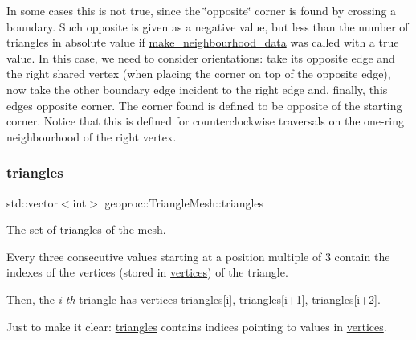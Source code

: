 In some cases this is not true, since the \char`\"{}opposite\char`\"{} corner is found by crossing a boundary. Such opposite is given as a negative value, but less than the number of triangles in absolute value if \hyperlink{classgeoproc_1_1TriangleMesh_a84003dfdfd5e591c00f01a797578ff1f}{make\+\_\+neighbourhood\+\_\+data} was called with a \textquotesingle{}true\textquotesingle{} value. In this case, we need to consider orientations\+: take its opposite edge and the \textquotesingle{}right\textquotesingle{} shared vertex (when placing the corner \textquotesingle{}on top of\textquotesingle{} the opposite edge), now take the other boundary edge incident to the \textquotesingle{}right\textquotesingle{} edge and, finally, this edge\textquotesingle{}s opposite corner. The corner found is defined to be opposite of the starting corner. Notice that this is defined for counterclockwise traversals on the one-\/ring neighbourhood of the \textquotesingle{}right\textquotesingle{} vertex. \mbox{\label{classgeoproc_1_1TriangleMesh_ad1cf20622f2bb080100862f413bd89c2}} 
\subsubsection{\texorpdfstring{triangles}{triangles}}
{\footnotesize\ttfamily std\+::vector$<$int$>$ geoproc\+::\+Triangle\+Mesh\+::triangles\hspace{0.3cm}{\ttfamily [protected]}}



The set of triangles of the mesh. 

Every three consecutive values starting at a position multiple of 3 contain the indexes of the vertices (stored in \hyperlink{classgeoproc_1_1TriangleMesh_a72052fc497d349c48966b937e5e3e834}{vertices}) of the triangle.

Then, the {\itshape i-\/th} triangle has vertices \hyperlink{classgeoproc_1_1TriangleMesh_ad1cf20622f2bb080100862f413bd89c2}{triangles}\mbox{[}i\mbox{]}, \hyperlink{classgeoproc_1_1TriangleMesh_ad1cf20622f2bb080100862f413bd89c2}{triangles}\mbox{[}i+1\mbox{]}, \hyperlink{classgeoproc_1_1TriangleMesh_ad1cf20622f2bb080100862f413bd89c2}{triangles}\mbox{[}i+2\mbox{]}.

Just to make it clear\+: \hyperlink{classgeoproc_1_1TriangleMesh_ad1cf20622f2bb080100862f413bd89c2}{triangles} contains indices pointing to values in \hyperlink{classgeoproc_1_1TriangleMesh_a72052fc497d349c48966b937e5e3e834}{vertices}. \mbox{\label{classgeoproc_1_1TriangleMesh_abbc25699f67776fc99c909124b0c584a}} 
